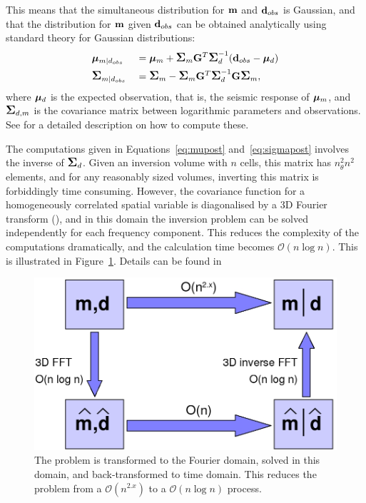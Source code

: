 This means that the simultaneous distribution for $\mathbf{m}$ and
$\mathbf{d}_{obs}$ is Gaussian, and that the distribution for $\mathbf{m}$
given $\mathbf{d}_{obs}$ can be obtained analytically using standard
theory for Gaussian distributions:
%
\begin{alignat}{2}
  &\bm\mu_{m|d_{obs}}    &&=\bm\mu_{m} +\mbox{\large\ensuremath{\boldsymbol{\Sigma}}}_{m}\mathbf{G}^T \mbox{\large\ensuremath{\boldsymbol{\Sigma}}}_{d}^{-1}
                           (\mathbf{d}_{obs}-\bm\mu_{d})     \label{eq:mupost} \\
  &\mbox{\large\ensuremath{\boldsymbol{\Sigma}}}_{m|d_{obs}} &&=\mbox{\large\ensuremath{\boldsymbol{\Sigma}}}_{m} - \mbox{\large\ensuremath{\boldsymbol{\Sigma}}}_{m}\mathbf{G}^T
                           \mbox{\large\ensuremath{\boldsymbol{\Sigma}}}_{d}^{-1}\mathbf{G}\mbox{\large\ensuremath{\boldsymbol{\Sigma}}}_{m},\label{eq:sigmapost}
\end{alignat}
%
where $\bm\mu_{d}$ is the expected observation, that is, the
seismic response of $\bm\mu_m$, and $\mbox{\large\ensuremath{\boldsymbol{\Sigma}}}_{d,m}$ is the
covariance matrix between logarithmic parameters and
observations. See \cite{geo68ab1} for a detailed description on
how to compute these.

The computations given in Equations~\eqref{eq:mupost}
and~\eqref{eq:sigmapost} involves the inverse of $\mbox{\large\ensuremath{\boldsymbol{\Sigma}}}_{d}$. Given an
inversion volume with $n$ cells, this matrix has $n_\theta^2n^2$
elements, and for any reasonably sized volumes, inverting this matrix
is forbiddingly time consuming. However, the covariance function for a
homogeneously correlated spatial variable is diagonalised by a 3D
Fourier transform (\cite{christakos92}), and in this domain the inversion
problem can be solved independently for each frequency component. This
reduces the complexity of the computations dramatically, and the
calculation time becomes $\mathcal{O}(n\log n)$. This is illustrated
in Figure~\ref{fig:FFT-flowdiagram}. Details can be found in
\cite{geo68ab2}
\begin{figure}[H]
  \includegraphics[width=.99\linewidth]{images/FFT_flowdiagram}
  \caption{The problem is transformed to the Fourier domain, solved
  in this domain, and back-transformed to time domain. This reduces
  the problem from a $\mathcal{O}(n^{2.x})$ to a $\mathcal{O}(n\log
  n)$ process.}
  \label{fig:FFT-flowdiagram}
\end{figure}


